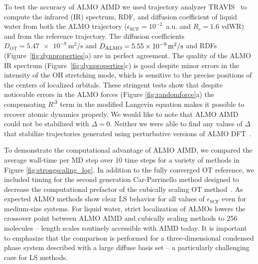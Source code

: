 \documentclass[aps,prl,reprint,amsmath,amssymb]{revtex4-1}
\begin{document}
To test the accuracy of ALMO AIMD we used trajectory analyzer TRAVIS~\cite{a:travis-main} to compute the infrared (IR) spectrum, RDF, and diffusion coefficient of liquid water from both the ALMO trajectory ($\epsilon_{\text{SCF}} = 10^{-2}$~a.u. and $R_{c} = 1.6$ vdWR) and from the reference trajectory.  
The diffusion coefficients $D_{\text{OT}}=\SI{5.47e-9}{\m^{2}\per\s}$ and $D_{\text{ALMO}}=\SI{5.55E-09}{\m^{2}\per\s}$ and RDFs (Figure~\ref{fig:dynproperties}a) are in perfect agreement. The quality of the ALMO IR spectrum (Figure~\ref{fig:dynproperties}c) is good despite minor errors in the intensity of the OH stretching mode, which is sensitive to the precise positions of the centers of localized orbitals. These stringent tests show that despite noticeable errors in the ALMO forces (Figure \ref{fig:randomforce}a) the compensating $R^{\Delta}$ term in the modified Langevin equation makes it possible to recover atomic dynamics properly. We would like to note that ALMO AIMD could not be stabilized with $\Delta=0$. Neither we were able to find any values of $\Delta$ that stabilize trajectories generated using perturbative versions of ALMO DFT~\cite{a:almo-ls}.



To demonstrate the computational advantage of ALMO AIMD, we compared the average wall-time per MD step over 10 time steps for a variety of methods in Figure \ref{fig:strongscaling_log}.
In addition to the fully converged OT reference, we included timing for the second generation Car-Parrinello method designed to decrease the computational prefactor of the cubically scaling OT method~\cite{a:2ndcpmd}.
As expected ALMO methods show clear LS behavior for all values of $\epsilon_{\text{SCF}}$ even for medium-size systems. 
For liquid water, strict localization of ALMOs lowers the crossover point between ALMO AIMD and cubically scaling methods to 256 molecules -- length scales routinely accessible with AIMD today. It is important to emphasize that the comparison is performed for a three-dimensional condensed phase system described with a large diffuse basis set -- a particularly challenging case for LS methods.
\end{document}

